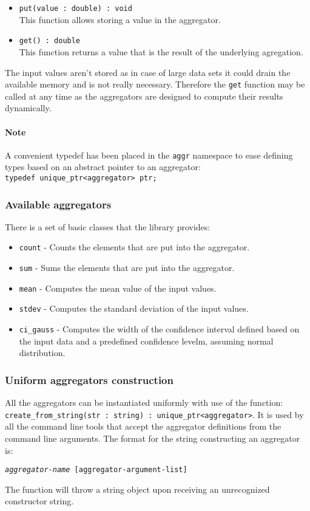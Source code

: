 \documentclass{report}
\begin{document}
	\begin{itemize}
		\item \texttt{put(value : double) : void}\\
			This function allows storing a value in the aggregator.
		\item \texttt{get() : double}\\
			This function returns a value that is the result of the
			underlying agregation.
	\end{itemize}

	The input values aren't stored as in case of large data sets it could drain the
	available memory and is not really necessary. Therefore the \texttt{get}
	function may be called at any time as the aggregators are designed to compute
	their results dynamically. 

	\paragraph{Note}
	A convenient typedef has been placed in the \texttt{aggr} namespace to ease
	defining types based on an abstract pointer to an aggregator:\\
	\texttt{typedef unique\_ptr<aggregator> ptr;}

	\subsubsection{Available aggregators}
	There is a set of basic classes that the library provides:

	\begin{itemize}
		\item \texttt{count} - Counts the elements that are put into the aggregator.
		\item \texttt{sum} - Sums the elements that are put into the aggregator.
		\item \texttt{mean} - Computes the mean value of the input values.
		\item \texttt{stdev} - Computes the standard deviation of the input values.
		\item \texttt{ci\_gauss} - Computes the width of the confidence
			interval defined based on the input data and a predefined
			confidence levelm, assuming normal distribution.
	\end{itemize}

	\subsubsection{Uniform aggregators construction}
	All the aggregators can be instantiated uniformly with use of the function:
	\texttt{create\_from\_string(str : string) : unique\_ptr<aggregator>}.
	It is used by all the command line tools that accept the aggregator definitions
	from the command line arguments. The format for the string constructing an
	aggregator is:
	\begin{center}
		\texttt{\textit{aggregator-name} [\texttt{aggregator-argument-list}]}
	\end{center}
	The function will throw a string object upon receiving an unrecognized constructor
	string.
\end{document}
